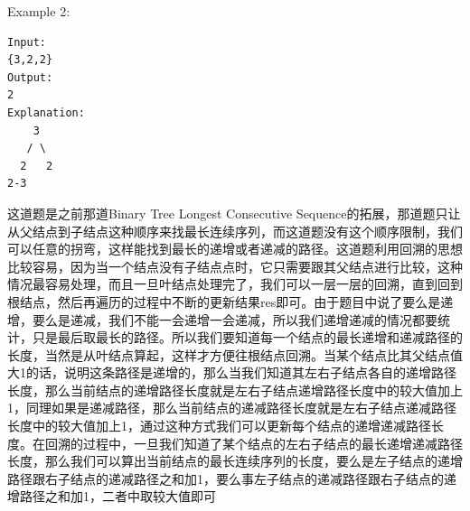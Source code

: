 \documentclass[11pt]{article}
\begin{document}
Example 2:

\begin{verbatim}
Input:
{3,2,2}
Output:
2
Explanation:
    3
   / \
  2   2
2-3
\end{verbatim}

这道题是之前那道Binary Tree Longest Consecutive
Sequence的拓展，那道题只让从父结点到子结点这种顺序来找最长连续序列，而这道题没有这个顺序限制，我们可以任意的拐弯，这样能找到最长的递增或者递减的路径。这道题利用回溯的思想比较容易，因为当一个结点没有子结点点时，它只需要跟其父结点进行比较，这种情况最容易处理，而且一旦叶结点处理完了，我们可以一层一层的回溯，直到回到根结点，然后再遍历的过程中不断的更新结果res即可。由于题目中说了要么是递增，要么是递减，我们不能一会递增一会递减，所以我们递增递减的情况都要统计，只是最后取最长的路径。所以我们要知道每一个结点的最长递增和递减路径的长度，当然是从叶结点算起，这样才方便往根结点回溯。当某个结点比其父结点值大1的话，说明这条路径是递增的，那么当我们知道其左右子结点各自的递增路径长度，那么当前结点的递增路径长度就是左右子结点递增路径长度中的较大值加上1，同理如果是递减路径，那么当前结点的递减路径长度就是左右子结点递减路径长度中的较大值加上1，通过这种方式我们可以更新每个结点的递增递减路径长度。在回溯的过程中，一旦我们知道了某个结点的左右子结点的最长递增递减路径长度，那么我们可以算出当前结点的最长连续序列的长度，要么是左子结点的递增路径跟右子结点的递减路径之和加1，要么事左子结点的递减路径跟右子结点的递增路径之和加1，二者中取较大值即可
\end{document}
